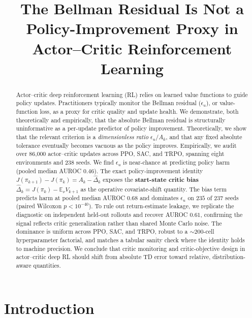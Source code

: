 \documentclass[11pt]{article}
\title{\textbf{The Bellman Residual Is Not a Policy-Improvement Proxy in Actor--Critic Reinforcement Learning}}
\author{}
\date{}
\begin{document}
\maketitle
\vspace{-2.5em}

\begin{abstract}
\noindent
Actor--critic deep reinforcement learning (RL) relies on learned value functions to guide policy updates. Practitioners typically monitor the Bellman residual ($\epsilon_u$), or value-function loss, as a proxy for critic quality and update health. We demonstrate, both theoretically and empirically, that the absolute Bellman residual is structurally uninformative as a per-update predictor of policy improvement. Theoretically, we show that the relevant criterion is a \emph{dimensionless ratio} $\epsilon_u / A_k$, and that any fixed absolute tolerance eventually becomes vacuous as the policy improves. Empirically, we audit over 86{,}000 actor--critic updates across PPO, SAC, and TRPO, spanning eight environments and 238 seeds. We find $\epsilon_u$ is near-chance at predicting policy harm (pooled median AUROC $0.46$). The exact policy-improvement identity $J(\pi_{k+1}) - J(\pi_k) = A_k - \hat\Delta_k$ exposes the \textbf{start-state critic bias} $\hat\Delta_k = J(\pi_k) - \mathbb{E}_\nu V_{k+1}$ as the operative covariate-shift quantity. The bias term predicts harm at pooled median AUROC $0.68$ and dominates $\epsilon_u$ on $235$ of $237$ seeds (paired Wilcoxon $p < 10^{-40}$). To rule out return-estimate leakage, we replicate the diagnostic on independent held-out rollouts and recover AUROC $0.61$, confirming the signal reflects critic generalization rather than shared Monte Carlo noise. The dominance is uniform across PPO, SAC, and TRPO, robust to a $\sim 200$-cell hyperparameter factorial, and matches a tabular sanity check where the identity holds to machine precision. We conclude that critic monitoring and critic-objective design in actor--critic deep RL should shift from absolute TD error toward relative, distribution-aware quantities.
\end{abstract}

\vspace{-0.3em}

\section{Introduction}
\label{sec:intro}
\end{document}
